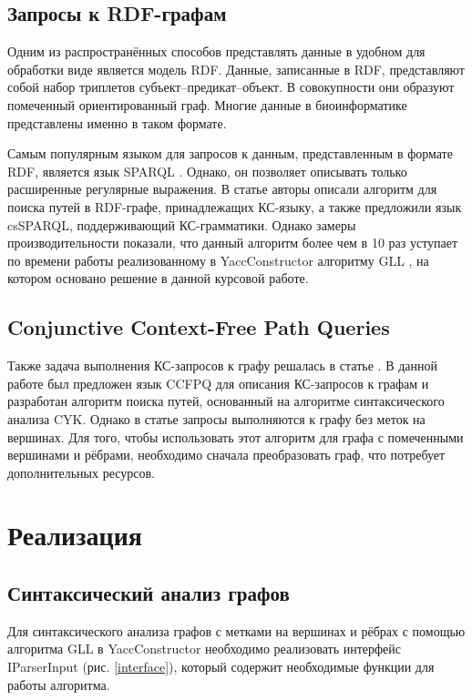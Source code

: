 \documentclass[14pt]{matmex-diploma}
\begin{document}
\subsection{Запросы к RDF-графам}
Одним из распространённых способов представлять данные в удобном для обработки виде является модель RDF. Данные, записанные в RDF, представляют собой набор триплетов субъект--предикат--объект. В совокупности они образуют помеченный ориентированный граф. Многие данные в биоинформатике представлены именно в таком формате.

Самым популярным языком для запросов к данным, представленным в формате RDF, является язык SPARQL \cite{prud2008sparql}. Однако, он позволяет описывать только расширенные регулярные выражения. В статье \cite{zhang2016context} авторы описали алгоритм для поиска путей в RDF-графе, принадлежащих КС-языку, а также предложили язык csSPARQL, поддерживающий КС-грамматики. Однако замеры производительности показали, что данный алгоритм более чем в 10 раз уступает по времени работы реализованному в YaccConstructor алгоритму GLL \cite{grigorev2016context}, на котором основано решение в данной курсовой работе.

\subsection{Conjunctive Context-Free Path Queries}
Также задача выполнения КС-запросов к графу решалась в статье \cite{hellings2014conjunctive}. В данной работе был предложен язык CCFPQ для описания КС-запросов к графам и разработан алгоритм поиска путей, основанный на алгоритме синтаксического анализа CYK. Однако в статье запросы выполняются к графу без меток на вершинах. Для того, чтобы использовать этот алгоритм для графа с помеченными вершинами и рёбрами, необходимо сначала преобразовать граф, что потребует дополнительных ресурсов.

\section{Реализация}

\subsection{Синтаксический анализ графов}
Для синтаксического анализа графов с метками на вершинах и рёбрах с помощью алгоритма GLL в YaccConstructor необходимо реализовать интерфейс IParserInput (рис. \ref{interface}), который содержит необходимые функции для работы алгоритма.
\end{document}
